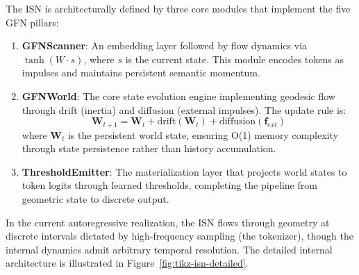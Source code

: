 \documentclass[12pt,a4paper]{article}
\begin{document}
The ISN is architecturally defined by three core modules that implement the five GFN pillars:
\begin{enumerate}
    \item \textbf{GFNScanner}: An embedding layer followed by flow dynamics via $\tanh(W \cdot s)$, where $s$ is the current state. This module encodes tokens as impulses and maintains persistent semantic momentum.

    \item \textbf{GFNWorld}: The core state evolution engine implementing geodesic flow through drift (inertia) and diffusion (external impulses). The update rule is:
    \begin{equation}
        \mathbf{W}_{t+1} = \mathbf{W}_t + \text{drift}(\mathbf{W}_t) + \text{diffusion}(\mathbf{f}_{ext})
        \label{eq:isn-flow}
    \end{equation}
    where $\mathbf{W}_t$ is the persistent world state, ensuring O(1) memory complexity through state persistence rather than history accumulation.

    \item \textbf{ThresholdEmitter}: The materialization layer that projects world states to token logits through learned thresholds, completing the pipeline from geometric state to discrete output.
\end{enumerate}

In the current autoregressive realization, the ISN flows through geometry at discrete intervals dictated by high-frequency sampling (the tokenizer), though the internal dynamics admit arbitrary temporal resolution. The detailed internal architecture is illustrated in Figure~\ref{fig:tikz-isn-detailed}.
\end{document}
